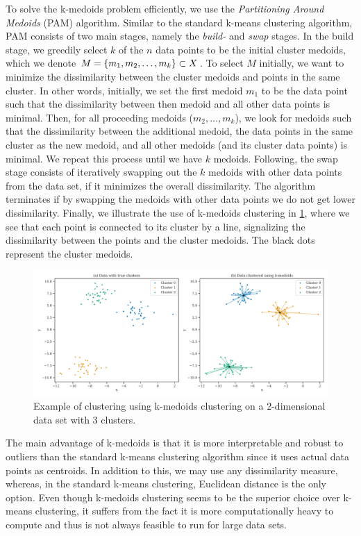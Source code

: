 To solve the k-medoids problem efficiently, we use the \textit{Partitioning Around Medoids} (PAM) algorithm. Similar to the standard k-means clustering algorithm, PAM consists of two main stages, namely the \textit{build-} and \textit{swap} stages. In the build stage, we greedily select $k$ of the $n$ data points to be the initial cluster medoids, which we denote $M = \left\{m_1, m_2, \ldots, m_k\right\} \subset X$. To select $M$ initially, we want to minimize the dissimilarity between the cluster medoids and points in the same cluster. In other words, initially, we set the first medoid $m_1$ to be the data point such that the dissimilarity between then medoid and all other data points is minimal. Then, for all proceeding medoids ($m_2, \ldots, m_k$), we look for medoids such that the dissimilarity between the additional medoid, the data points in the same cluster as the new medoid, and all other medoids (and its cluster data points) is minimal. We repeat this process until we have $k$ medoids. Following, the swap stage consists of iteratively swapping out the $k$ medoids with other data points from the data set, if it minimizes the overall dissimilarity. The algorithm terminates if by swapping the medoids with other data points we do not get lower dissimilarity. Finally, we illustrate the use of k-medoids clustering in \cref{fig:k-medoids-clustering-2d-example}, where we see that each point is connected to its cluster by a line, signalizing the dissimilarity between the points and the cluster medoids. The black dots represent the cluster medoids.
\begin{figure}[H]
    \centering
    \includegraphics[width=\textwidth]{thesis/figures/k-medoids-clustering-2d-example.pdf}
    \caption{Example of clustering using k-medoids clustering on a 2-dimensional data set with 3 clusters.}
    \label{fig:k-medoids-clustering-2d-example}
\end{figure}

The main advantage of k-medoids is that it is more interpretable and robust to outliers than the standard k-means clustering algorithm since it uses actual data points as centroids. In addition to this, we may use any dissimilarity measure, whereas, in the standard k-means clustering, Euclidean distance is the only option. Even though k-medoids clustering seems to be the superior choice over k-means clustering, it suffers from the fact it is more computationally heavy to compute and thus is not always feasible to run for large data sets.

